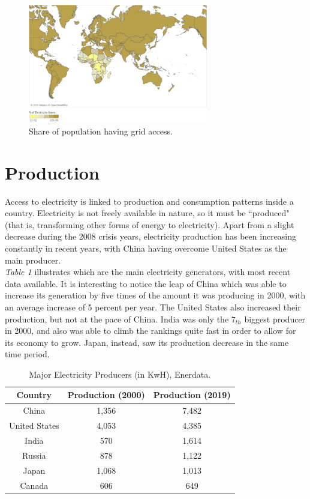 \documentclass{book}
\begin{document}
\bigskip
\begin{figure}[H]
\begin{center}
\captionsetup{justification=centering}
\includegraphics[width=0.7\textwidth]{Images/access.png}
\caption{Share of population having grid access. }
\end{center}
\end{figure}
\bigskip

\section{Production}

Access to electricity is linked to production and consumption patterns inside a country. Electricity is not freely available in nature, so it must be ``produced" (that is, transforming other forms of energy to electricity). Apart from a slight decrease during the 2008 crisis years, electricity production has been increasing constantly in recent years, with China having overcome United States as the main producer.\\

\textit{Table 1} illustrates which are the main electricity generators, with most recent data available. It is interesting to notice the leap of China which was able to increase its generation by five times of the amount it was producing in 2000, with an average increase of 5 percent per year. The United States also increased their production, but not at the pace of China. India was only the $7_{th}$ biggest producer in 2000, and also was able to climb the rankings quite fast in order to allow for its economy to grow. Japan, instead, saw its production decrease in the same time period.

\bigskip
\begin{table}[H]
\begin{center}
\begin{tabular}{|c|c|c|}
\hline
Country & Production (2000) & Production (2019)\\
\hline
China & 1,356 & 7,482\\
United States & 4,053 & 4,385\\
India & 570 & 1,614\\
Russia & 878 & 1,122\\
Japan & 1,068 & 1,013\\
Canada & 606 & 649\\
\hline
\end{tabular}
\caption{Major Electricity Producers (in KwH), Enerdata.}
\end{center}
\end{table}
\end{document}

